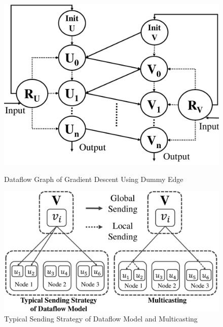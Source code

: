\documentclass{llncs}
\begin{document}
\begin{figure}[h]
\begin{minipage}[t]{0.45\linewidth}
\centering
\includegraphics[width=\textwidth]{pics/DDCF.pdf}
\vspace{-20pt}
\caption{Dataflow Graph of Gradient Descent Using Dummy Edge \label{fig:DDCF}}
\end{minipage}
\hfill
\begin{minipage}[t]{0.5\linewidth}
\centering
\includegraphics[width=\textwidth]{pics/multicasting.pdf}
\vspace{-20pt}
\caption{Typical Sending Strategy of Dataflow Model and Multicasting \label{fig:multicasting}}
\end{minipage}
\vspace{-15pt}
\end{figure}

\vspace{-20pt}
\end{document}

